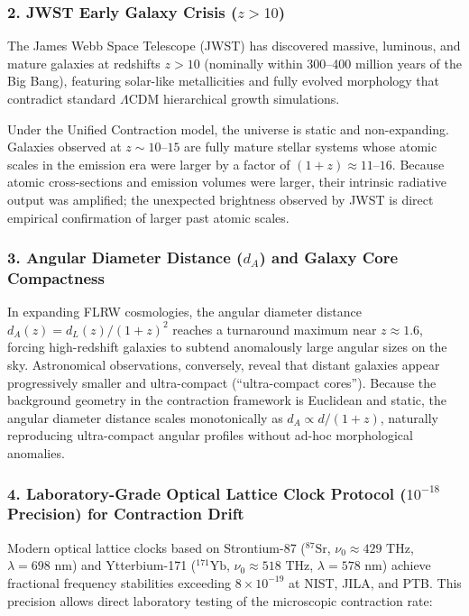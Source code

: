 \subsubsection{2. JWST Early Galaxy Crisis (\texorpdfstring{$z > 10$}{z > 10})}
The James Webb Space Telescope (JWST) has discovered massive, luminous, and mature galaxies at redshifts $z > 10$ (nominally within 300--400 million years of the Big Bang), featuring solar-like metallicities and fully evolved morphology that contradict standard $\Lambda$CDM hierarchical growth simulations.

Under the Unified Contraction model, the universe is static and non-expanding. Galaxies observed at $z \sim 10$--$15$ are fully mature stellar systems whose atomic scales in the emission era were larger by a factor of $(1+z) \approx 11$--$16$. Because atomic cross-sections and emission volumes were larger, their intrinsic radiative output was amplified; the unexpected brightness observed by JWST is direct empirical confirmation of larger past atomic scales.

\subsubsection{3. Angular Diameter Distance (\texorpdfstring{$d_A$}{dA}) and Galaxy Core Compactness}
In expanding FLRW cosmologies, the angular diameter distance $d_A(z) = d_L(z) / (1+z)^2$ reaches a turnaround maximum near $z \approx 1.6$, forcing high-redshift galaxies to subtend anomalously large angular sizes on the sky. Astronomical observations, conversely, reveal that distant galaxies appear progressively smaller and ultra-compact (``ultra-compact cores''). Because the background geometry in the contraction framework is Euclidean and static, the angular diameter distance scales monotonically as $d_A \propto d / (1+z)$, naturally reproducing ultra-compact angular profiles without ad-hoc morphological anomalies.

\subsubsection{4. Laboratory-Grade Optical Lattice Clock Protocol (\texorpdfstring{$10^{-18}$}{10^-18} Precision) for Contraction Drift}
\label{sec:optik_kafes_protokol}
Modern optical lattice clocks based on Strontium-87 ($^{87}\mathrm{Sr}$, $\nu_0 \approx 429\text{ THz}$, $\lambda = 698\text{ nm}$) and Ytterbium-171 ($^{171}\mathrm{Yb}$, $\nu_0 \approx 518\text{ THz}$, $\lambda = 578\text{ nm}$) achieve fractional frequency stabilities exceeding $8 \times 10^{-19}$ at NIST, JILA, and PTB. This precision allows direct laboratory testing of the microscopic contraction rate:

